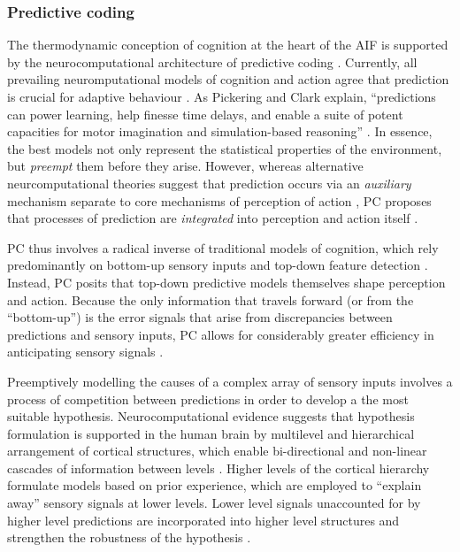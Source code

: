 \begin{CJK}{UTF8}{gbsn}
  \subsubsection{Predictive coding\label{sect:predictiveCoding}}
The thermodynamic conception of cognition at the heart of the AIF is supported by the neurocomputational architecture of predictive coding  \citep[hereafter PC, see][]{Rao1999,Clark2013}.  Currently, all prevailing neuromputational models of cognition and action agree that prediction is crucial for adaptive behaviour \citep{Wolpert2003,Clark2013}. As Pickering and Clark explain, ``predictions can power learning, help finesse time delays, and enable a suite of potent capacities for motor imagination and simulation-based reasoning'' \citep[6]{Pickering2014}.  In essence, the best models not only represent the statistical properties of the environment, but \textit{preempt} them before they arise.  However, whereas alternative neurcomputational theories suggest that prediction occurs via an \textit{auxiliary} mechanism separate to core mechanisms of perception of action \citep{Wolpert1997}, PC proposes that processes of prediction are \textit{integrated} into perception and action itself \citep[for a more detailed review of Auxiliary Forward Models and Integrative Forward Models, see Appendix ~\ref{app2:theory}, Section ~\ref{app2:motorControl};][]{Pickering2014}.

PC thus involves a radical inverse of traditional models of cognition, which rely predominantly on bottom-up sensory inputs and top-down feature detection \citep[e.g.,][]{Marr1985}. Instead, PC posits that top-down predictive models themselves shape perception and action.  Because the only information that travels forward (or from the ``bottom-up'') is the error signals that arise from discrepancies between predictions and sensory inputs, PC allows for considerably greater efficiency in anticipating sensory signals \citep[for a more detailed explanation of the PC paradigm, including its origins as a data compression strategy, see Appendix~\ref{app2:theory} Section ~\ref{app2:predictiveCoding}][]{Pickering2014}.

Preemptively modelling the causes of a complex array of sensory inputs involves a process of competition between predictions in order to develop a the most suitable hypothesis.  Neurocomputational evidence suggests that hypothesis formulation is supported in the human brain by multilevel and hierarchical arrangement of cortical structures, which enable bi-directional and non-linear cascades of information between levels \citep{Feldman2010}.  Higher levels of the cortical hierarchy formulate models based on prior experience, which are employed to ``explain away'' sensory signals at lower levels.  Lower level signals unaccounted for by higher level predictions are incorporated into higher level structures and strengthen the robustness of the hypothesis \citep{Clark2013}.


\end{CJK}
